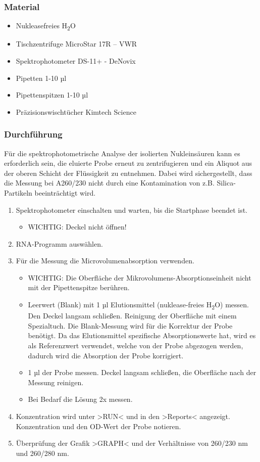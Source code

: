 \documentclass[a4paper,12pt]{article}
\begin{document}
\subsubsection*{Material}

\begin{itemize}
    \item Nukleasefreies H\textsubscript{2}O
    \item Tischzentrifuge MicroStar 17R – VWR
    \item Spektrophotometer DS-11+ - DeNovix
    \item Pipetten 1-10 µl
    \item Pipettenspitzen 1-10 µl
    \item Präzisionswischtücher Kimtech Science
\end{itemize}

\subsubsection*{Durchführung}

Für die spektrophotometrische Analyse der isolierten Nukleinsäuren kann es erforderlich sein, die eluierte Probe erneut zu zentrifugieren und ein Aliquot aus der oberen Schicht der Flüssigkeit zu entnehmen. Dabei wird sichergestellt, dass die Messung bei A260/230 nicht durch eine Kontamination von z.B. Silica-Partikeln beeinträchtigt wird.

\begin{enumerate}
    \item Spektrophotometer einschalten und warten, bis die Startphase beendet ist.
    \begin{itemize}
        \item WICHTIG: Deckel nicht öffnen!
    \end{itemize}
    \item RNA-Programm auswählen.
    \item Für die Messung die Microvolumenabsorption verwenden.
    \begin{itemize}
        \item WICHTIG: Die Oberfläche der Mikrovolumens-Absorptionseinheit nicht mit der Pipettenspitze berühren.
        \item Leerwert (Blank) mit 1 µl Elutionsmittel (nuklease-freies H\textsubscript{2}O) messen. Den Deckel langsam schließen. Reinigung der Oberfläche mit einem Spezialtuch. Die Blank-Messung wird für die Korrektur der Probe benötigt. Da das Elutionsmittel spezifische Absorptionswerte hat, wird es als Referenzwert verwendet, welche von der Probe abgezogen werden, dadurch wird die Absorption der Probe korrigiert.
        \item 1 µl der Probe messen. Deckel langsam schließen, die Oberfläche nach der Messung reinigen.
        \item Bei Bedarf die Lösung 2x messen.
    \end{itemize}
    \item Konzentration wird unter >RUN< und in den >Reports< angezeigt. Konzentration und den OD-Wert der Probe notieren.
    \item Überprüfung der Grafik >GRAPH< und der Verhältnisse von 260/230 nm und 260/280 nm.
\end{enumerate}
\end{document}
